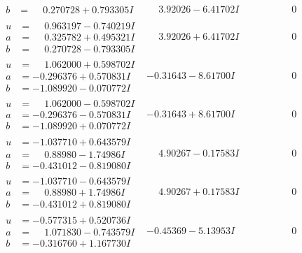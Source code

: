 \documentclass[1p]{elsarticle_modified}
\theoremstyle{definition}
\begin{document}
$$\begin{array}{c|c|c}
\begin{aligned}
b &= \phantom{-}0.270728 + 0.793305 I\end{aligned}
 & \phantom{-}3.92026 - 6.41702 I & \phantom{-0.000000 } 0 \\ \hline\begin{aligned}
u &= \phantom{-}0.963197 - 0.740219 I \\
a &= \phantom{-}0.325782 + 0.495321 I \\
b &= \phantom{-}0.270728 - 0.793305 I\end{aligned}
 & \phantom{-}3.92026 + 6.41702 I & \phantom{-0.000000 } 0 \\ \hline\begin{aligned}
u &= \phantom{-}1.062000 + 0.598702 I \\
a &= -0.296376 + 0.570831 I \\
b &= -1.089920 - 0.070772 I\end{aligned}
 & -0.31643 - 8.61700 I & \phantom{-0.000000 } 0 \\ \hline\begin{aligned}
u &= \phantom{-}1.062000 - 0.598702 I \\
a &= -0.296376 - 0.570831 I \\
b &= -1.089920 + 0.070772 I\end{aligned}
 & -0.31643 + 8.61700 I & \phantom{-0.000000 } 0 \\ \hline\begin{aligned}
u &= -1.037710 + 0.643579 I \\
a &= \phantom{-}0.88980 - 1.74986 I \\
b &= -0.431012 - 0.819080 I\end{aligned}
 & \phantom{-}4.90267 - 0.17583 I & \phantom{-0.000000 } 0 \\ \hline\begin{aligned}
u &= -1.037710 - 0.643579 I \\
a &= \phantom{-}0.88980 + 1.74986 I \\
b &= -0.431012 + 0.819080 I\end{aligned}
 & \phantom{-}4.90267 + 0.17583 I & \phantom{-0.000000 } 0 \\ \hline\begin{aligned}
u &= -0.577315 + 0.520736 I \\
a &= \phantom{-}1.071830 - 0.743579 I \\
b &= -0.316760 + 1.167730 I\end{aligned}
 & -0.45369 - 5.13953 I & \phantom{-0.000000 } 0 \\ \hline\begin{aligned}

\end{aligned}
\end{array}$$
\end{document}
